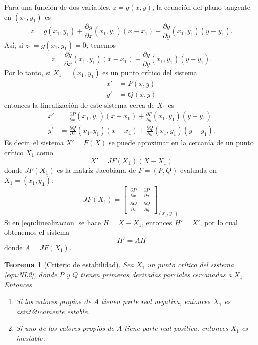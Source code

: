 \documentclass[11pt,letterpaper,draft]{report}
\newtheorem{thm}{Teorema}
\newcommand\<{\langle}
\renewcommand\>{\rangle}
\begin{document}
Para una función de dos variables, $z=g(x,y)$, la ecuación del
plano tangente en $(x_1,y_1)$ es
\[
  z = g(x_1,y_1) + \frac{\partial g}{\partial x}(x_1,y_1)(x-x_1)
  + \frac{\partial g}{\partial y}(x_1,y_1)(y-y_1)
.\]
Así, si $z_1=g(x_1,y_1)=0$, tenemos
\[
  z =
  \frac{\partial g}{\partial x}(x_1,y_1)(x-x_1)
  + \frac{\partial g}{\partial y}(x_1,y_1)(y-y_1)
.\]
Por lo tanto, si $X_1=(x_1,y_1)$ es un punto crítico del sistema
\begin{align*}\label{eqn:NL2}
  x' &= P(x,y) \\
  y' &= Q(x,y) \tag{1}
\end{align*}
entonces la linealización de este sistema cerca de $X_1$ es
\begin{align*}
  x' &= \frac{\partial P}{\partial x}(x_1,y_1)(x-x_1)
  + \frac{\partial P}{\partial y}(x_1,y_1)(y-y_1) \\
  y' &= \frac{\partial Q}{\partial x}(x_1,y_1)(x-x_1)
  + \frac{\partial Q}{\partial y}(x_1,y_1)(y-y_1).
\end{align*}
Es decir, el sistema $X'=F(X)$ se puede aproximar en la cercanía
de un punto crítico $X_1$ como
\begin{equation}\label{eqn:linealizacion}
  X' = JF(X_1)(X-X_1)
\end{equation}
donde $JF(X_1)$ es la matríz Jacobiana de $F=(P,Q)$ evaluada en
$X_1=(x_1,y_1)$:
\[
  JF(X_1)
  =
  \begin{bmatrix}
    \frac{\partial P}{\partial x} & \frac{\partial P}{\partial y}
    \\[2mm]
    \frac{\partial Q}{\partial x} & \frac{\partial Q}{\partial y}
  \end{bmatrix}_{(x_1,y_1).}
\]
Si en \eqref{eqn:linealizacion} se hace $H=X-X_1$, entonces
$H'=X'$, por lo cual obtenemos el sistema
\[
  H'=AH
\]
donde $A=JF(X_1)$.

\begin{thm}[Criterio de estabilidad]
  Sea $X_1$ un punto crítico del sistema \eqref{eqn:NL2}, donde
  $P$ y $Q$ tienen primeras derivadas parciales cercanadas a
  $X_1$.
  Entonces
  \begin{enumerate}
    \item Si los valores propios de $A$ tienen parte real
    negativa, entonces $X_1$ es asintótica\-mente estable.
    \item Si \emph{uno} de los valores propios de $A$ tiene parte
    real positiva, entonces $X_1$ es inestable.
  \end{enumerate}
\end{thm}
\end{document}
